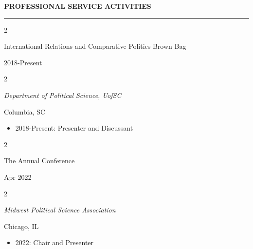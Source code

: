 \documentclass[
  16,
]{article}
\providecommand{\tightlist}{%
  \setlength{\itemsep}{0pt}\setlength{\parskip}{0pt}}
\begin{document}
\vspace{7pt}

\begin{large}
  {\bf PROFESSIONAL SERVICE ACTIVITIES}
\end{large}
  \vspace{3pt}
  \hrule
  \begin{multicols}{2}
    \begin{flushleft}International Relations and Comparative Politics Brown Bag\end{flushleft}
    \begin{flushright}2018-Present\end{flushright}
  \end{multicols}
  \begin{multicols}{2}
    \begin{flushleft}\textit{Department of Political Science, UofSC}\end{flushleft}
    \begin{flushright}Columbia, SC\end{flushright}
  \end{multicols}
  \vspace{-0.17cm}

\begin{itemize}
\tightlist
\item
  2018-Present: Presenter and Discussant
\end{itemize}

\begin{multicols}{2}
    \begin{flushleft}The Annual Conference\end{flushleft}
    \begin{flushright}Apr 2022\end{flushright}
  \end{multicols}
  \begin{multicols}{2}
    \begin{flushleft}\textit{Midwest Political Science Association}\end{flushleft}
    \begin{flushright}Chicago, IL\end{flushright}
  \end{multicols}
  \vspace{-0.17cm}

\begin{itemize}
\tightlist
\item
  2022: Chair and Presenter
\end{itemize}
\end{document}
